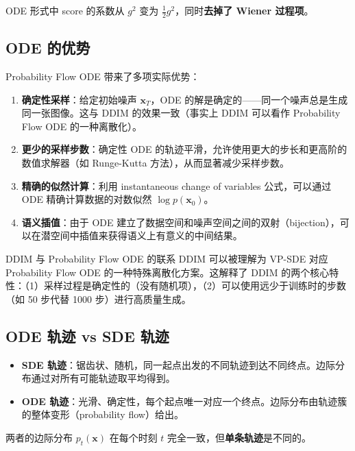 \documentclass[a4paper]{article}
\begin{document}
ODE 形式中 score 的系数从 $g^2$ 变为 $\frac{1}{2}g^2$，同时\textbf{去掉了 Wiener 过程项}。

\subsection{ODE 的优势}

Probability Flow ODE 带来了多项实际优势：

\begin{enumerate}
    \item \textbf{确定性采样}：给定初始噪声 $\mathbf{x}_T$，ODE 的解是确定的——同一个噪声总是生成同一张图像。这与 DDIM 的效果一致（事实上 DDIM 可以看作 Probability Flow ODE 的一种离散化）。
    \item \textbf{更少的采样步数}：确定性 ODE 的轨迹平滑，允许使用更大的步长和更高阶的数值求解器（如 Runge-Kutta 方法），从而显著减少采样步数。
    \item \textbf{精确的似然计算}：利用 instantaneous change of variables 公式，可以通过 ODE 精确计算数据的对数似然 $\log p(\mathbf{x}_0)$。
    \item \textbf{语义插值}：由于 ODE 建立了数据空间和噪声空间之间的双射（bijection），可以在潜空间中插值来获得语义上有意义的中间结果。
\end{enumerate}

\begin{knowledgebox}{DDIM 与 Probability Flow ODE 的联系}
DDIM 可以被理解为 VP-SDE 对应 Probability Flow ODE 的一种特殊离散化方案。这解释了 DDIM 的两个核心特性：（1）采样过程是确定性的（没有随机项），（2）可以使用远少于训练时的步数（如 50 步代替 1000 步）进行高质量生成。
\end{knowledgebox}

\subsection{ODE 轨迹 vs SDE 轨迹}

\begin{itemize}
    \item \textbf{SDE 轨迹}：锯齿状、随机，同一起点出发的不同轨迹到达不同终点。边际分布通过对所有可能轨迹取平均得到。
    \item \textbf{ODE 轨迹}：光滑、确定性，每个起点唯一对应一个终点。边际分布由轨迹簇的整体变形（probability flow）给出。
\end{itemize}

两者的边际分布 $p_t(\mathbf{x})$ 在每个时刻 $t$ 完全一致，但\textbf{单条轨迹}是不同的。
\end{document}
